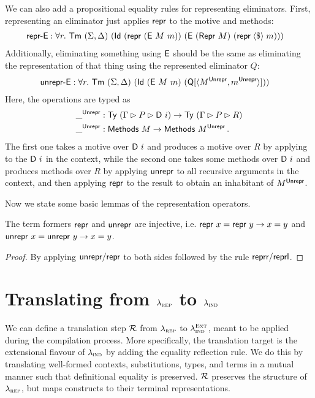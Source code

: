 We can also add a propositional equality rules for representing eliminators.
First, representing an eliminator just applies $\textsf{repr}$ to the motive and methods:
\begin{align*}
&\mta{repr-E} : \forall r.\ \Tm\ (\Sigma, \Delta)\ (\mta{Id}\ (\Mrepr\ (\mta{E}\ M\ m))\ (\mta{E}\ (\mta{Repr}\ M)\ (\mta{repr} \fmap m)))
\end{align*}
Additionally, eliminating something using $\textsf{E}$ should be the same as
eliminating the representation of that thing using the represented eliminator $Q$:
\begin{align*}
&\mta{unrepr-E} : \forall r.\ \Tm\ (\Sigma, \Delta)\ (\mta{Id}\ (\mta{E}\ M\ m)\ (\mta{Q}[\Msub{M^{\mta{Unrepr}}, m^{\mta{Unrepr}}}]))
\end{align*}
Here, the  operations are typed as
\begin{align*}
&\_^{\mta{Unrepr}} : \Ty\ (\Gamma \rhd P \rhd \mta{D}\ i) \to \Ty\ (\Gamma \rhd P \rhd R) \\
&\_^{\mta{Unrepr}} : \mta{Methods}\ M \to \mta{Methods}\ M^{\mta{Unrepr}}\,.
\end{align*}
The first one takes a motive over $\textsf{D}\ i$ and produces a motive over $R$ by applying
 to the $\textsf{D}\ i$ in the context, while the second one takes some
methods over $\textsf{D}\ i$ and produces methods over $R$ by applying
$\textsf{unrepr}$ to all recursive arguments in the context, and then applying
$\textsf{repr}$ to the result to obtain an inhabitant of $M^{\textsf{Unrepr}}$.

Now we state some basic lemmas of the representation operators.

\begin{lemma}
	The term formers $\textsf{repr}{}$ and $\textsf{unrepr}{}$ are injective, i.e.
	$\textsf{repr}\ x = \textsf{repr}\ y \to x = y$ and $\textsf{unrepr}\ x = \textsf{unrepr}\ y \to x = y$.
	\begin{proof}
				By applying $\textsf{unrepr}/\textsf{repr}$ to both sides
				followed by the rule $\textsf{reprr}/\textsf{reprl}$.
	\end{proof}
\end{lemma}

\section{Translating from $\lambda_{\textsc{rep}}$ to $\lambda_{\textsc{ind}}$}

We can define a translation step $\mathcal{R}$ from $\lambda_{\textsc{rep}}$ to
$\lambda_{\textsc{ind}}^{\textsc{Ext}}$, meant to be applied during the compilation process.
More specifically, the translation target is the extensional flavour of
$\lambda_{\textsc{ind}}$ by adding the equality reflection rule. We do this by translating
well-formed contexts, substitutions, types, and terms in a mutual manner such
that definitional equality is preserved. $\mathcal{R}$ preserves the structure of
$\lambda_{\textsc{rep}}$, but maps constructs to their terminal representations.

